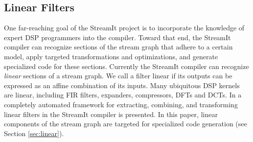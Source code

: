 \subsection{Linear Filters}
One far-reaching goal of the StreamIt project is to incorporate the
knowledge of expert DSP programmers into the compiler.  Toward that
end, the StreamIt compiler can recognize sections of the stream graph
that adhere to a certain model, apply targeted transformations and
optimizations, and generate specialized code for these sections.
Currently the StreamIt compiler can recognize {\it linear} sections of
a stream graph. We call a filter linear if its outputs can be
expressed as an affine combination of its inputs.  Many ubiquitous DSP
kernels are linear, including FIR filters, expanders, compressors,
DFTs and DCTs.  In \cite{streamit-linear} a completely automated
framework for extracting, combining, and transforming linear filters
in the StreamIt compiler is presented.  In this paper, linear
components of the stream graph are targeted for specialized code
generation (see Section \ref{sec:linear}).

